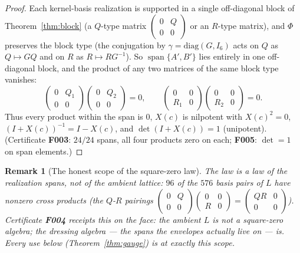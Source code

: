 \documentclass[11pt]{article}
\newcommand{\R}{\mathbb R}
\newtheorem{remark}[theorem]{Remark}
\begin{document}
\begin{proof}
Each kernel-basis realization is supported in a single off-diagonal
block of Theorem~\ref{thm:block} (a $Q$-type matrix
$\left(\begin{smallmatrix}0&Q\\0&0\end{smallmatrix}\right)$ or an
$R$-type matrix), and $\Phi$ preserves the block type (the
conjugation by $\gamma=\mathrm{diag}(G,I_6)$ acts on $Q$ as
$Q\mapsto GQ$ and on $R$ as $R\mapsto RG^{-1}$). So
$\operatorname{span}\{A',B'\}$ lies entirely in one off-diagonal
block, and the product of any two matrices of the same block type
vanishes:
\[
\begin{pmatrix}0&Q_1\\0&0\end{pmatrix}
\begin{pmatrix}0&Q_2\\0&0\end{pmatrix}=0,\qquad
\begin{pmatrix}0&0\\R_1&0\end{pmatrix}
\begin{pmatrix}0&0\\R_2&0\end{pmatrix}=0.
\]
Thus every product within the span is $0$, $X(c)$ is nilpotent with
$X(c)^2=0$, $(I+X(c))^{-1}=I-X(c)$, and
$\det(I+X(c))=1$ (unipotent). (Certificate \textbf{F003}: $24/24$
spans, all four products zero on each; \textbf{F005}: $\det=1$ on
span elements.)
\end{proof}

\begin{remark}[The honest scope of the square-zero law]
The law is a law of the realization \emph{spans}, not of the ambient
lattice: $96$ of the $576$ basis pairs of $L$ have nonzero cross
products (the $Q$-$R$ pairings
$\left(\begin{smallmatrix}0&Q\\0&0\end{smallmatrix}\right)
\left(\begin{smallmatrix}0&0\\R&0\end{smallmatrix}\right)
=\left(\begin{smallmatrix}QR&0\\0&0\end{smallmatrix}\right)$).
Certificate \textbf{F004} receipts this on the face: the ambient $L$
is not a square-zero algebra; the dressing algebra --- the spans the
envelopes actually live on --- is. Every use below
(Theorem~\ref{thm:gauge}) is at exactly this scope.
\end{remark}
\end{document}
